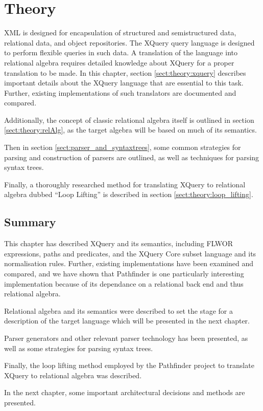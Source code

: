 \chapter{Theory}
\label{chapter:theory}
XML is designed for encapsulation of structured and semistructured data,
relational data, and object repositories. The XQuery query language is designed
to perform flexible queries in such data. A translation of the language into
relational algebra requires detailed knowledge about XQuery for a proper translation to be made. In this chapter, section
\ref{sect:theory:xquery} describes important details about the XQuery
language that are essential to this task. Further, existing implementations of
such translators are documented and compared.

Additionally, the concept of classic relational algebra itself is outlined in
section \ref{sect:theory:relAlg}, as the target algebra will be based on much
of its semantics.

Then in section \ref{sect:parser_and_syntaxtrees}, some common strategies for
parsing and construction of parsers are outlined, as well as techniques for
parsing syntax trees.

Finally, a thoroughly researched method for translating XQuery to relational
algebra dubbed ``Loop Lifting'' is described in section \ref{sect:theory:loop_lifting}.







\section{Summary}
\label{sect:theory:summary}
This chapter has described XQuery and its semantics, including FLWOR
expressions, paths and predicates, and the XQuery Core subset language and its
normalisation rules. Further, existing implementations have been examined and
compared, and we have shown that Pathfinder is one particularly interesting
implementation because of its dependance on a relational back end and thus relational algebra.

Relational algebra and its semantics were described to set the stage for a
description of the target language which will be presented in the next chapter.

Parser generators and other relevant parser technology has been presented, as
well as some strategies for parsing syntax trees.

Finally, the loop lifting method employed by the Pathfinder project to
translate XQuery to relational algebra was described.

In the next chapter, some important architectural decisions and methods are
presented.